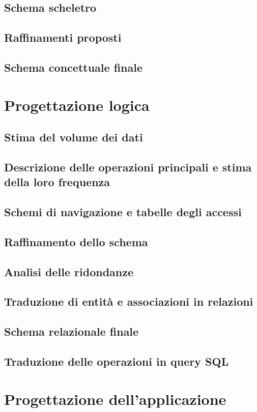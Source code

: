 \documentclass[a4paper,11pt]{report}
\begin{document}
\section{Schema scheletro}
\section{Raffinamenti proposti}

\section{Schema concettuale finale}


\chapter{Progettazione logica}
\section{Stima del volume dei dati}

\section{Descrizione delle operazioni principali e stima della loro frequenza}

\section{Schemi di navigazione e tabelle degli accessi}

\section{Raffinamento dello schema}

\section{Analisi delle ridondanze}

\section{Traduzione di entità e associazioni in relazioni}

\section{Schema relazionale finale}

\section{Traduzione delle operazioni in query SQL}


\chapter{Progettazione dell'applicazione}
\end{document}
